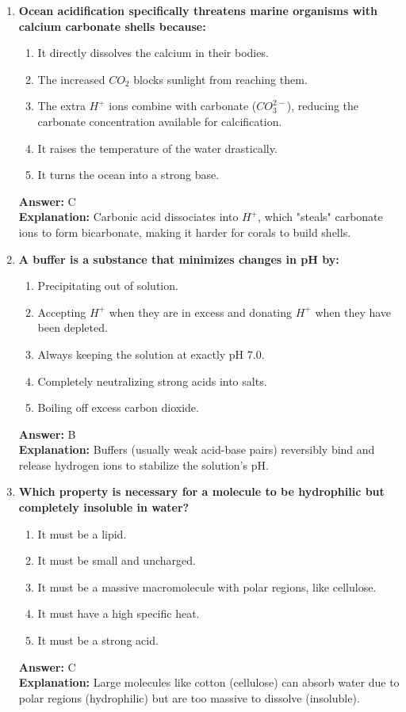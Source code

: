\documentclass[11pt, a4paper]{article}
\begin{document}
\begin{enumerate}
\item \textbf{Ocean acidification specifically threatens marine organisms with calcium carbonate shells because:}
\begin{enumerate}[label=\Alph*.]
    \item It directly dissolves the calcium in their bodies.
    \item The increased $CO_2$ blocks sunlight from reaching them.
    \item The extra $H^+$ ions combine with carbonate ($CO_3^{2-}$), reducing the carbonate concentration available for calcification.
    \item It raises the temperature of the water drastically.
    \item It turns the ocean into a strong base.
\end{enumerate}
\textbf{Answer:} C \\
\textbf{Explanation:} Carbonic acid dissociates into $H^+$, which "steals" carbonate ions to form bicarbonate, making it harder for corals to build shells.

\item \textbf{A buffer is a substance that minimizes changes in pH by:}
\begin{enumerate}[label=\Alph*.]
    \item Precipitating out of solution.
    \item Accepting $H^+$ when they are in excess and donating $H^+$ when they have been depleted.
    \item Always keeping the solution at exactly pH 7.0.
    \item Completely neutralizing strong acids into salts.
    \item Boiling off excess carbon dioxide.
\end{enumerate}
\textbf{Answer:} B \\
\textbf{Explanation:} Buffers (usually weak acid-base pairs) reversibly bind and release hydrogen ions to stabilize the solution's pH.

\item \textbf{Which property is necessary for a molecule to be hydrophilic but completely insoluble in water?}
\begin{enumerate}[label=\Alph*.]
    \item It must be a lipid.
    \item It must be small and uncharged.
    \item It must be a massive macromolecule with polar regions, like cellulose.
    \item It must have a high specific heat.
    \item It must be a strong acid.
\end{enumerate}
\textbf{Answer:} C \\
\textbf{Explanation:} Large molecules like cotton (cellulose) can absorb water due to polar regions (hydrophilic) but are too massive to dissolve (insoluble).


\end{enumerate}
\end{document}
